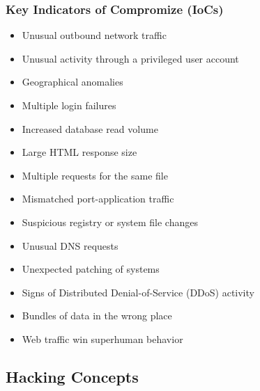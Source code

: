 \subsubsection{Key Indicators of Compromize (IoCs)}
\begin{itemize}
    \item Unusual outbound network traffic
    \item Unusual activity through a privileged user account
    \item Geographical anomalies
    \item Multiple login failures
    \item Increased database read volume 
    \item Large HTML response size
    \item Multiple requests for the same file
    \item Mismatched port-application traffic
    \item Suspicious registry or system file changes
    \item Unusual DNS requests
    \item Unexpected patching of systems
    \item Signs of Distributed Denial-of-Service (DDoS) activity
    \item Bundles of data in the wrong place
    \item Web traffic win superhuman behavior
\end{itemize}

\subsection{Hacking Concepts}